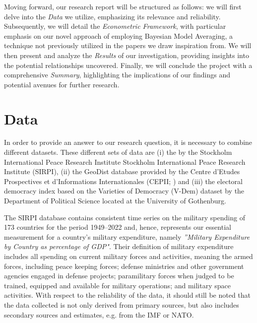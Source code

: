 \documentclass[12pt,a4paper]{article}
\begin{document}
Moving forward, our research report will be structured as follows: we will first delve into the \textit{Data} we utilize, emphasizing its relevance and reliability. Subsequently, we will detail the \textit{Econometric Framework}, with particular emphasis on our novel approach of employing Bayesian Model Averaging, a technique not previously utilized in the papers we draw inspiration from. We will then present and analyze the \textit{Results} of our investigation, providing insights into the potential relationships uncovered. Finally, we will conclude the project with a comprehensive \emph{Summary},
highlighting the implications of our findings and potential avenues for further research.

\section{Data}
In order to provide an answer to our research question, it is necessary to combine different datasets. These different sets of data are (i) the \citet{SIRPI} by the Stockholm International Peace Research Institute Stockholm International Peace Research Institute (SIRPI), (ii) the GeoDist database provided by the Centre d'Etudes Prospectives et d'Informations Internationales (CEPII; \citealp{mayer2011}) and (iii) the electoral democracy index based on the Varieties of Democracy (V-Dem) dataset \citep{VDEM} by the Department of Political Science located at the University of Gothenburg. 

The SIRPI database contains consistent time series on the military spending of 173  countries for the period 1949–2022 and, hence, represents our essential measurement for a country's military expenditure, namely \textit{''Military Expenditure by Country as percentage of GDP"}. Their definition of military expenditure includes all spending on current military forces and activities, meaning the armed forces, including peace keeping forces; defense ministries and other government agencies engaged in defense projects; paramilitary forces when judged to be trained, equipped and available for military operations; and military space activities. With respect to the reliability of the data, it should still be noted that the data collected is not only derived from primary sources, but also includes secondary sources and estimates, e.g. from the IMF or NATO.
 
\end{document}
